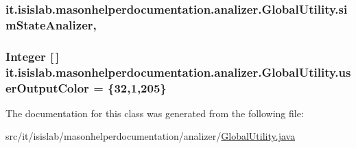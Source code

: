 \hypertarget{classit_1_1isislab_1_1masonhelperdocumentation_1_1analizer_1_1_global_utility_a4ed7ab5249d920545c5081d813ef1029}{
\subsubsection[{sim\-State\-Analizer}]{ it.\-isislab.\-masonhelperdocumentation.\-analizer.\-Global\-Utility.\-sim\-State\-Analizer\hspace{0.3cm}{\ttfamily [static]}, {\ttfamily [private]}}}\label{classit_1_1isislab_1_1masonhelperdocumentation_1_1analizer_1_1_global_utility_a4ed7ab5249d920545c5081d813ef1029}
\hypertarget{classit_1_1isislab_1_1masonhelperdocumentation_1_1analizer_1_1_global_utility_aec864cd710b27ece609c5a6093211ff4}{
\subsubsection[{user\-Output\-Color}]{\setlength{\rightskip}{0pt plus 5cm}Integer \mbox{[}$\,$\mbox{]} it.\-isislab.\-masonhelperdocumentation.\-analizer.\-Global\-Utility.\-user\-Output\-Color = \{32,1,205\}\hspace{0.3cm}{\ttfamily [static]}}}\label{classit_1_1isislab_1_1masonhelperdocumentation_1_1analizer_1_1_global_utility_aec864cd710b27ece609c5a6093211ff4}


The documentation for this class was generated from the following file\-:\begin{DoxyCompactItemize}
\item 
src/it/isislab/masonhelperdocumentation/analizer/\hyperlink{_global_utility_8java}{Global\-Utility.\-java}\end{DoxyCompactItemize}
